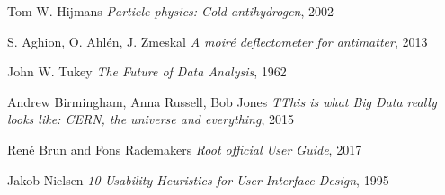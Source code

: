 \begin{thebibliography}{6}

 Tom W. Hijmans \emph{Particle physics: Cold antihydrogen}, 2002

 S. Aghion, O. Ahlén, J. Zmeskal \emph{A moiré deflectometer for antimatter}, 2013

 John W. Tukey \emph{The Future of Data Analysis}, 1962

  Andrew Birmingham, Anna Russell, Bob Jones \emph{TThis is what Big Data really looks like: CERN, the universe and everything}, 2015

  René Brun and Fons Rademakers \emph{Root official User Guide}, 2017

  Jakob Nielsen \emph{10 Usability Heuristics for User Interface Design},  1995

\end{thebibliography}
